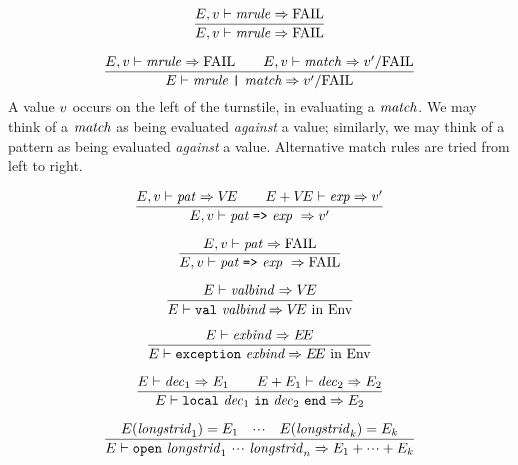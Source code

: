 \begin{equation}	%
\frac{\E,\V\ts\mrule\ra\FAIL}
     {\E,\V\ts\mrule\ra\FAIL}
\end{equation}

\begin{equation}	%
\frac{\E,\V\ts\mrule\ra\FAIL\qquad\E,\V\ts\match\ra\V'/\FAIL}
     {\E\ts\longmatcha\ra\V'/\FAIL}
\end{equation}
\comment A value $v$ occurs on the left of the turnstile, in evaluating
a ${\it match}$. We may think of a ${\it match}$ as being evaluated {\sl against}
a value; similarly, we may think of a pattern as being evaluated {\sl
against} a value.
Alternative match rules are tried from left to right.

\begin{equation}	%
\frac{\E,\V\ts\pat\ra\VE\qquad\E+\VE\ts\exp\ra\V'}
     {\E,\V\ts\longmrule\ \ra\V'}\index{54.2}
\end{equation}

\begin{equation}	%
\frac{\E,\V\ts\pat\ra\FAIL}
     {\E,\V\ts\longmrule\ \ra\FAIL}
\end{equation}

%
%
\begin{equation}	%
\frac{\E\ts\valbind\ra\VE}
     {\E\ts\valdec\ra\VE\ \In\ \Env}\index{54.3}
\end{equation}

\begin{equation}	%
\frac{\E\ts\exnbind\ra\EE }
     {\E\ts\exceptiondec\ra\EE\ \In\ \Env }
\end{equation}

\begin{equation}	%
\frac{\E\ts\dec_1\ra\E_1\qquad\E+\E_1\ts\dec_2\ra\E_2}
     {\E\ts\localdec\ra\E_2}
\end{equation}

\begin{equation}                %
\frac{ \E(\longstrid_1)=\E_1
            \quad\cdots\quad
       \E(\longstrid_k)=\E_k }
     { \E\ts\openstrdec\ra \E_1 + \cdots + \E_k }
\end{equation}

